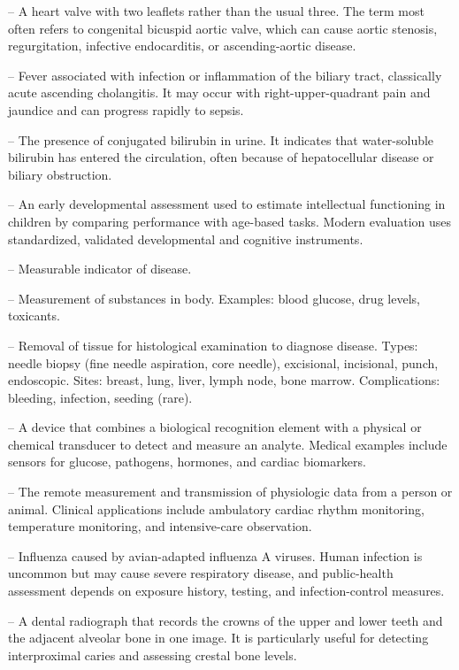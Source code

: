 -- A heart valve with two leaflets rather than the usual three. The term most often refers to congenital bicuspid aortic valve, which can cause aortic stenosis, regurgitation, infective endocarditis, or ascending-aortic disease.

-- Fever associated with infection or inflammation of the biliary tract, classically acute ascending cholangitis. It may occur with right-upper-quadrant pain and jaundice and can progress rapidly to sepsis.

-- The presence of conjugated bilirubin in urine. It indicates that water-soluble bilirubin has entered the circulation, often because of hepatocellular disease or biliary obstruction.


-- An early developmental assessment used to estimate intellectual functioning in children by comparing performance with age-based tasks. Modern evaluation uses standardized, validated developmental and cognitive instruments.

-- Measurable indicator of disease.

-- Measurement of substances in body. Examples: blood glucose, drug levels, toxicants.


-- Removal of tissue for histological examination to diagnose disease. Types: needle biopsy (fine needle aspiration, core needle), excisional, incisional, punch, endoscopic. Sites: breast, lung, liver, lymph node, bone marrow. Complications: bleeding, infection, seeding (rare).

-- A device that combines a biological recognition element with a physical or chemical transducer to detect and measure an analyte. Medical examples include sensors for glucose, pathogens, hormones, and cardiac biomarkers.

-- The remote measurement and transmission of physiologic data from a person or animal. Clinical applications include ambulatory cardiac rhythm monitoring, temperature monitoring, and intensive-care observation.

-- Influenza caused by avian-adapted influenza A viruses. Human infection is uncommon but may cause severe respiratory disease, and public-health assessment depends on exposure history, testing, and infection-control measures.

-- A dental radiograph that records the crowns of the upper and lower teeth and the adjacent alveolar bone in one image. It is particularly useful for detecting interproximal caries and assessing crestal bone levels.

